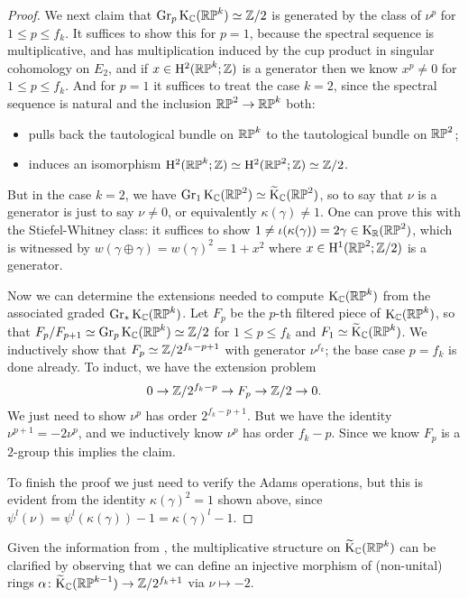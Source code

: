 \begin{proof}
  We next claim that $\operatorname{Gr}_p\mathrm{K}_{\mathbb{C}}(\mathbb{RP}^k) \simeq \mathbb{Z}/2$ is generated by
  the class of $\nu^p$ for $1 \le p \le f_k$. It suffices to show this
  for $p=1$, because the spectral sequence is multiplicative, and has
  multiplication induced by the cup product in singular cohomology on
  $E_2$, and if $x \in \mathrm{H}^2(\mathbb{RP}^k;\mathbb{Z})$ is a generator then we know
  $x^p \ne 0$ for $1 \le p \le f_k$. And for $p=1$ it suffices to
  treat the case $k=2$, since the spectral sequence is natural and the
  inclusion $\mathbb{RP}^2 \to \mathbb{RP}^k$ both:
  \begin{itemize}
  \item pulls back the tautological bundle on $\mathbb{RP}^k$ to the
    tautological bundle on $\mathbb{RP}^2$;
  \item induces an isomorphism $\mathrm{H}^2(\mathbb{RP}^k;\mathbb{Z}) \simeq \mathrm{H}^2(\mathbb{RP}^2;\mathbb{Z})
    \simeq \mathbb{Z}/2$.
  \end{itemize}
  But in the case $k=2$, we have $ \operatorname{Gr}_1\mathrm{K}_{\mathbb{C}}(\mathbb{RP}^2) \simeq
  \widetilde{\mathrm{K}}_{\mathbb{C}}(\mathbb{RP}^2)$, so to say that $\nu$ is a generator is just to say
  $\nu \ne 0$, or equivalently $\kappa(\gamma) \ne 1$. One can prove
  this with the Stiefel-Whitney class: it suffices to show $1 \ne
  \iota(\kappa(\gamma)) = 2\gamma \in \mathrm{K}_{\mathbb{R}}(\mathbb{RP}^2)$, which is
  witnessed by $w(\gamma\oplus\gamma) = w(\gamma)^2 = 1+x^2$ where $x
  \in \mathrm{H}^1(\mathbb{RP}^2;\mathbb{Z}/2)$ is a generator.

  Now we can determine the extensions needed to compute $\mathrm{K}_{\mathbb{C}}(\mathbb{RP}^k)$
  from the associated graded $\operatorname{Gr}_*\mathrm{K}_{\mathbb{C}}(\mathbb{RP}^k)$. Let $F_p$ be the
  $p$-th filtered piece of $\mathrm{K}_{\mathbb{C}}(\mathbb{RP}^k)$, so that $F_p/F_{p+1} \simeq
  \operatorname{Gr}_p\mathrm{K}_{\mathbb{C}}(\mathbb{RP}^k) \simeq \mathbb{Z}/2$ for $1 \le p \le f_k$ and $F_1 \simeq
  \widetilde{\mathrm{K}}_{\mathbb{C}}(\mathbb{RP}^k)$. We inductively show that $F_p \simeq
  \mathbb{Z}/2^{f_k-p+1}$ with generator $\nu^{f_k}$; the base case $p=f_k$ is
  done already. To induct, we have the extension problem
  \[
  0 \to \mathbb{Z}/2^{f_k-p} \to F_p \to \mathbb{Z}/2 \to 0.
  \]
  We just need to show $\nu^p$ has order $2^{f_k-p+1}$. But we have the
  identity $\nu^{p+1} = -2\nu^p$, and we inductively know $\nu^p$ has
  order $f_k-p$. Since we know $F_p$ is a $2$-group this implies the
  claim.

  To finish the proof we just need to verify the Adams operations, but
  this is evident from the identity $\kappa(\gamma)^2 = 1$ shown
  above, since $\psi^l(\nu) = \psi^l(\kappa(\gamma)) - 1 =
  \kappa(\gamma)^l - 1$.
\end{proof}

\begin{remark}
  \label{RP-ringhom}
  Given the information from , the multiplicative
  structure on $\widetilde{\mathrm{K}}_{\mathbb{C}}(\mathbb{RP}^k)$ can be clarified by observing that we
  can define an injective morphism of (non-unital) rings $\alpha \colon
  \widetilde{\mathrm{K}}_{\mathbb{C}}(\mathbb{RP}^{k-1}) \to \mathbb{Z}/2^{f_k+1}$ via $\nu \mapsto -2$.
\end{remark}

